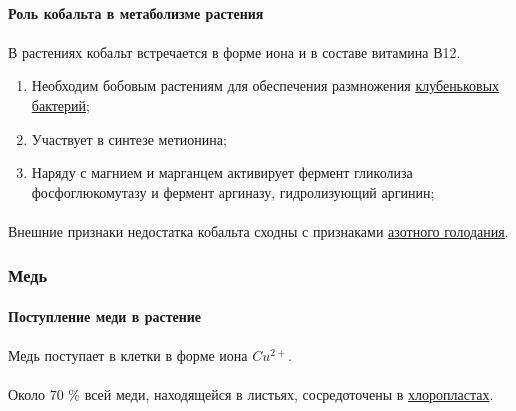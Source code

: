 \paragraph*{Роль кобальта в метаболизме растения}
\paragraph*{}В растениях кобальт встречается в форме иона и в  составе витамина В12.
\begin{enumerate}
\item Необходим бобовым растениям для обеспечения размножения \hyperlink{nitrificators}{клубеньковых бактерий};
\item Участвует в синтезе метионина;
\item Наряду с магнием и марганцем активирует фермент гликолиза фосфоглюкомутазу и фермент аргиназу, гидролизующий аргинин;
\end{enumerate}

\paragraph*{}Внешние признаки недостатка кобальта сходны с признаками \hyperlink{nitroHungry}{азотного голодания}.

\subsubsection*{Медь}

\paragraph*{Поступление меди в растение}

\paragraph*{}Медь поступает в клетки в форме иона $Cu^{2+}$. 

\paragraph*{}Около 70 \% всей меди, находящейся в листьях, сосредоточены в \hyperlink{cell_plastids}{хлоропластах}.


